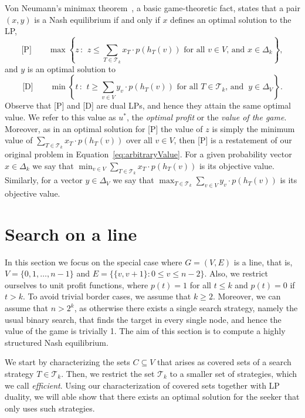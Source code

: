 \documentclass[11pt]{article}
\newcommand\+{\mkern2mu}
\newcommand{\T}{T}
\begin{document}
Von Neumann's minimax  theorem~\cite{v1928theorie}, a basic game-theoretic fact, states that a pair $(x,y)$ is a Nash equilibrium if and only if $x$ defines an optimal solution to the LP,
$$ \text{[P]}  \qquad  \max\left\lbrace  z \,:\,
    \ z\le  \sum_{\T \in \mathcal{T}_k}x_{\T} \cdot p(h_T(v))  \text{ for all }  v \in V \text{, and } x \in \Delta_k\right\rbrace,
$$
and $y$ is an optimal solution to
$$ \text{[D]} \qquad  \min\left \lbrace t \,:\,
 \ t \ge \sum_{v \in V}y_{v} \cdot p(h_T(v)) \text{ for all } T\in \mathcal{T}_k\text{, and } \ y\in \Delta_V\right\rbrace. 
$$
Observe that [P] and [D] are dual LPs, and hence they attain the same optimal value. We refer to this value as $u^*$, the \textit{optimal profit} or the \textit{value of the game}. Moreover, as in an optimal solution for [P] the value of $z$ is simply the minimum value of $\sum_{\T \in \mathcal{T}_k}x_{\T} \cdot p(h_T(v))$ over all $v\in V$, then [P] is a restatement of our original problem in Equation~\eqref{eq:arbitraryValue}. For a given probability vector $x\in \Delta_k$ we say that $\min_{v \in V}\sum_{\T \in \mathcal{T}_k}x_{\T} \cdot p(h_T(v))$ is its objective value. Similarly, for a vector $y\in \Delta_V$ we say that $\max_{T\in \mathcal{T}_k}\sum_{v \in V}y_{v} \cdot p(h_T(v))$ is its objective value.



\section{Search on a line}\label{sec:line}
In this section we focus on the special case where $G=(V,E)$ is a line, that is, $V=\{0,1,\ldots,n-1\}$ and $E=\{\{v,v+1\}:0\le v\le n-2\}$. Also, we restrict ourselves to unit profit functions, where $p(t)=1$ for all $t\le k$ and $p(t)=0$ if $t>k$. To avoid trivial border cases, we assume that $k\ge 2$. Moreover, we can assume that $n > 2^k$, as otherwise there exists a single search strategy, namely the usual binary search, that finds the target in every single node, and hence the value of the game is trivially 1. The aim of this section is to compute a highly structured Nash equilibrium.

We start by characterizing the sets $C\subseteq V$ that arises as covered sets of a search strategy $T\in \mathcal{T}_k$. Then, we restrict the set $\mathcal{T}_k$ to a smaller set of strategies, which we call \textit{efficient}. Using our characterization of covered sets together with LP duality, we will able show that there exists an optimal solution for the seeker that only uses such strategies.
\end{document}
